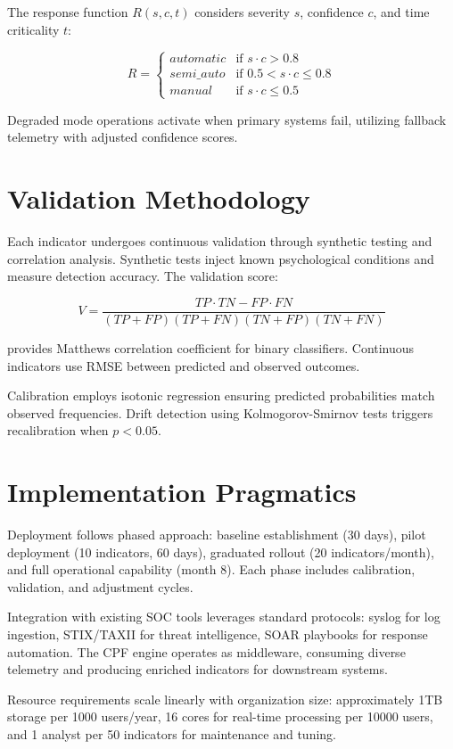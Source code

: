 \documentclass[10pt, twocolumn]{article}
\begin{document}
The response function $R(s, c, t)$ considers severity $s$, confidence $c$, and time criticality $t$:

$$R = \begin{cases}
automatic & \text{if } s \cdot c > 0.8 \\
semi\_auto & \text{if } 0.5 < s \cdot c \leq 0.8 \\
manual & \text{if } s \cdot c \leq 0.5
\end{cases}$$

Degraded mode operations activate when primary systems fail, utilizing fallback telemetry with adjusted confidence scores.

\section{Validation Methodology}

Each indicator undergoes continuous validation through synthetic testing and correlation analysis. Synthetic tests inject known psychological conditions and measure detection accuracy. The validation score:

$$V = \frac{TP \cdot TN - FP \cdot FN}{(TP + FP)(TP + FN)(TN + FP)(TN + FN)}$$

provides Matthews correlation coefficient for binary classifiers. Continuous indicators use RMSE between predicted and observed outcomes.

Calibration employs isotonic regression ensuring predicted probabilities match observed frequencies. Drift detection using Kolmogorov-Smirnov tests triggers recalibration when $p < 0.05$.

\section{Implementation Pragmatics}

Deployment follows phased approach: baseline establishment (30 days), pilot deployment (10 indicators, 60 days), graduated rollout (20 indicators/month), and full operational capability (month 8). Each phase includes calibration, validation, and adjustment cycles.

Integration with existing SOC tools leverages standard protocols: syslog for log ingestion, STIX/TAXII for threat intelligence, SOAR playbooks for response automation. The CPF engine operates as middleware, consuming diverse telemetry and producing enriched indicators for downstream systems.

Resource requirements scale linearly with organization size: approximately 1TB storage per 1000 users/year, 16 cores for real-time processing per 10000 users, and 1 analyst per 50 indicators for maintenance and tuning.
\end{document}
